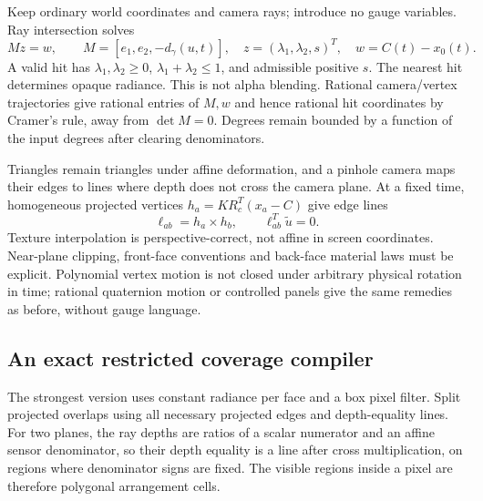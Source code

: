 \documentclass[10pt,letterpaper]{article}
\theoremstyle{remark}\newtheorem{counterexample}[proposition]{Counterexample}
\begin{document}
Keep ordinary world coordinates and camera rays; introduce no gauge variables. Ray intersection solves
\begin{equation}
 Mz=w,\qquad M=[e_1,e_2,-d_\gamma(u,t)],\quad
 z=(\lambda_1,\lambda_2,s)^T,\quad w=C(t)-x_0(t). \label{eq:trisolve}
\end{equation}
A valid hit has $\lambda_1,\lambda_2\geq0$, $\lambda_1+\lambda_2\leq1$, and admissible positive $s$. The nearest hit determines opaque radiance. This is not alpha blending. Rational camera/vertex trajectories give rational entries of $M,w$ and hence rational hit coordinates by Cramer's rule, away from $\det M=0$. Degrees remain bounded by a function of the input degrees after clearing denominators.

Triangles remain triangles under affine deformation, and a pinhole camera maps their edges to lines where depth does not cross the camera plane. At a fixed time, homogeneous projected vertices $h_a=KR_c^T(x_a-C)$ give edge lines
\begin{equation}
 \ell_{ab}=h_a\times h_b,\qquad \ell_{ab}^T\widetilde u=0.
\end{equation}
Texture interpolation is perspective-correct, not affine in screen coordinates. Near-plane clipping, front-face conventions and back-face material laws must be explicit. Polynomial vertex motion is not closed under arbitrary physical rotation in time; rational quaternion motion or controlled panels give the same remedies as before, without gauge language.

\subsection{An exact restricted coverage compiler}
The strongest version uses constant radiance per face and a box pixel filter. Split projected overlaps using all necessary projected edges and depth-equality lines. For two planes, the ray depths are ratios of a scalar numerator and an affine sensor denominator, so their depth equality is a line after cross multiplication, on regions where denominator signs are fixed. The visible regions inside a pixel are therefore polygonal arrangement cells.
\end{document}
